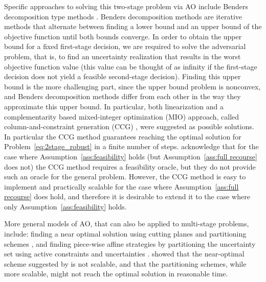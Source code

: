 \documentclass[12pt,x11names]{article}
\theoremstyle{definition}
\newcommand{\bu}{{\bf u}}
\newcommand{\bx}{{\bf x}}
\begin{document}
Specific approaches to solving this two-stage problem via AO include Benders decomposition type methods \citep{benders1962}. Benders decomposition methods are iterative methods that alternate between finding a lower bound and an upper bound of the objective function until both bounds converge.
In order to obtain the upper bound for a fixed first-stage decision, we are required to solve the adversarial problem,  that is, to find an uncertainty realization that results in the worst objective function value (this value can be thought of as infinity if the first-stage decision does not yield a feasible second-stage decision).
Finding this upper bound is the more challenging part, since the upper bound problem is nonconvex, and Benders decomposition methods differ from each other in the way they approximate this upper bound. 
In particular, both linearization \citep{Bertsimas2013} and a complementarity based mixed-integer optimization (MIO) approach, called column-and-constraint generation (CCG) \citep{Zeng2013}, were suggested as possible solutions. 
In particular the CCG method guarantees reaching the optimal solution for Problem~\eqref{eq:2stage_robust} in a finite number of steps. \citet{Zeng2013} acknowledge that for the case where Assumption~\ref{ass:feasibility} holds (but Assumption~\ref{ass:full recourse} does not) the CCG method requires a feasibility oracle, but they do not provide such an oracle for the general problem. However, the CCG method is easy to implement and practically scalable for the case where Assumption~\ref{ass:full recourse} does hold, and therefore it is desirable to extend it to the case where only Assumption~\ref{ass:feasibility} holds. 

More general models of AO, that can also be applied to multi-stage problems, include: finding a near optimal solution using cutting planes and partitioning schemes \citep{BertsimasGeorghiou2015}, and finding piece-wise affine strategies by partitioning the uncertainty set using active constraints and uncertainties \citep{BertsimasDunning2014,PostekDenHertog2014}. \citet{BertsimasDunning2014} showed that the near-optimal scheme suggested by \citet{BertsimasGeorghiou2015} is not scalable, and that the partitioning schemes, while more scalable, might not reach the optimal solution in reasonable time.
\end{document}
